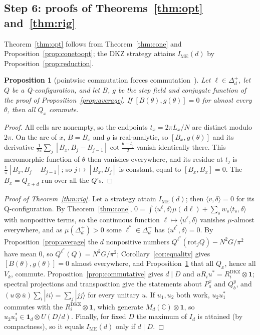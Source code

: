 \documentclass[11pt]{article}
\newtheorem{proposition}[lemma]{Proposition}
\theoremstyle{remark}
\numberwithin{equation}{section}
\newcommand{\C}{\mathbb{C}}
\newcommand{\IME}{I_{\mathrm{ME}}}
\newcommand{\one}{\mathbf{1}}
\newcommand{\ip}[2]{\langle #1,#2\rangle}
\newcommand{\dd}{\,\mathrm{d}}
\newcommand{\DKZ}{\mathrm{DKZ}}
\begin{document}
\subsection{Step 6: proofs of Theorems~\ref{thm:opt} and~\ref{thm:rig}}\label{subsec:proofs12}
Theorem~\ref{thm:opt} follows from Theorem~\ref{thm:cone} and Proposition~\ref{prop:conetoopt}; the DKZ strategy attains
$\IME(d)$ by Proposition~\ref{prop:reduction}.

\begin{proposition}[pointwise commutation forces commutation~{\cite[Lemma~7.2, Proposition~7.3]{MSmath}}]\label{prop:residue}
Let $\ell\in\Delta_d^+$, let $Q$ be a Q-configuration, and let $B$, $g$ be the step field and conjugate function of the
proof of Proposition~\ref{prop:average}. If $[B(\theta),g(\theta)]=0$ for almost every $\theta$, then all $Q_x$ commute.
\end{proposition}

\begin{proof}
All cells are nonempty, so the endpoints $t_x=2\pi L_x/N$ are distinct modulo $2\pi$. On the arc of $x$, $B=B_x$ and $g$
is real-analytic, so $[B_x,g(\theta)]$ and its derivative $\frac1{2\pi}\sum_j[B_x,B_j-B_{j-1}]\cot\frac{\theta-t_j}2$
vanish identically there. This meromorphic function of $\theta$ then vanishes everywhere, and its residue at $t_j$ is
$\frac1\pi[B_x,B_j-B_{j-1}]$; so $j\mapsto[B_x,B_j]$ is constant, equal to $[B_x,B_x]=0$. The $B_x=Q_{x+d}$ run over all
the $Q$'s.
\end{proof}

\begin{proof}[Proof of Theorem~\ref{thm:rig}]
Let a strategy attain $\IME(d)$; then $\ip v\delta=0$ for its Q-configuration. By Theorem~\ref{thm:cone},
$0=\int\ip{u^\ell}\delta\mu(\dd\ell)+\sum_sw_s\ip{t_s}\delta$ with nonpositive terms, so the continuous function
$\ell\mapsto\ip{u^\ell}\delta$ vanishes $\mu$-almost everywhere, and as $\mu(\Delta_d^+)>0$ some $\ell^*\in\Delta_d^+$ has
$\ip{u^{\ell^*}}\delta=0$. By Proposition~\ref{prop:average} the $d$ nonpositive numbers
$Q^{\ell^*}(\mathrm{rot}_jQ)-N^2G/\pi^2$ have mean $0$, so $Q^{\ell^*}(Q)=N^2G/\pi^2$; Corollary~\ref{cor:equality} gives
$[B(\theta),g(\theta)]=0$ almost everywhere, and Proposition~\ref{prop:residue} that all $Q_x$, hence all $V_k$, commute.
Proposition~\ref{prop:commutative} gives $d\mid D$ and $uR_iu^*=R_i^{\DKZ}\otimes\one$; spectral projections and
transposition give the statements about $P^x_a$ and $Q^y_b$, and $(u\otimes\bar u)\sum_i|ii\rangle=\sum_j|jj\rangle$ for
every unitary $u$. If $u_1,u_2$ both work, $u_2u_1^*$ commutes with the $R_i^{\DKZ}\otimes\one$, which generate
$M_d(\C)\otimes\one$, so $u_2u_1^*\in\one_d\otimes U(D/d)$. Finally, for fixed $D$ the maximum of $I_d$ is attained (by
compactness), so it equals $\IME(d)$ only if $d\mid D$.
\end{proof}
\end{document}
